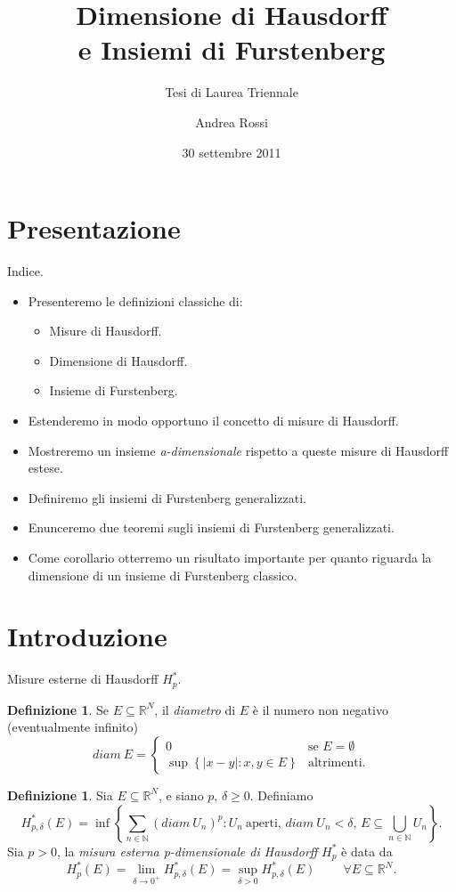 \documentclass[intlimits]{beamer}
\title[Dim. Hausdorff e Ins. Furstenberg]
{Dimensione di Hausdorff\\ e Insiemi di Furstenberg}
\subtitle{Tesi di Laurea Triennale}
\author{Andrea Rossi}
\institute{Università di Pisa}
\date{30 settembre 2011}
\numberwithin{equation}{section}
\theoremstyle{plain}
\theoremstyle{definition}
\newtheorem{defin}[teor]{Definizione}
\theoremstyle{remark}
\newcommand{\gra}[1]{\left\{#1\right\}}
\newcommand{\pa}[1]{\left(#1\right)}
\newcommand{\abs}[1]{\left\lvert#1\right\rvert}
\renewcommand{\ge}{\geqslant}
\begin{document}
\begin{frame}
  \titlepage
\end{frame}



\section{Presentazione}
\begin{frame}{Indice.}
  \begin{itemize}[<+->]
    \item Presenteremo le definizioni classiche di:
      \begin{itemize}[<+->]
        \item Misure di Hausdorff.
        \item Dimensione di Hausdorff.
        \item Insieme di Furstenberg.
        \end{itemize}
    \item
      Estenderemo in modo opportuno il concetto di misure di Hausdorff.
    \item
      Mostreremo un insieme \textit{a-dimensionale} rispetto a queste misure di Hausdorff estese.
    \item
      Definiremo gli insiemi di Furstenberg generalizzati.
    \item
      Enunceremo due teoremi sugli insiemi di Furstenberg generalizzati.
    \item
      Come corollario otterremo un risultato importante per quanto riguarda
      la dimensione di un insieme di Furstenberg classico.
  \end{itemize}
\end{frame}





\section{Introduzione}
\begin{frame}{Misure esterne di Hausdorff $H_p^*$.}
\begin{defin}
Se $E \subseteq \mathbb{R}^N$, il \emph{diametro} di $E$ è il numero 
non negativo (eventualmente infinito)
  \[ diam\ E = \begin{cases}
    0 & \text{se $E = \emptyset$}\\
    \sup \gra{\abs{x- y} : x, y \in E} & \text{altrimenti}
.\end{cases}\]
\end{defin}
\pause
\begin{defin}
Sia $E \subseteq \mathbb{R}^N$, e siano $p,\,\delta \ge 0$. Definiamo
  \[ H^{*}_{p,\delta}(E) = \inf\gra{ \sum_{n \in \mathbb{N}}\pa{diam\ U_n}^p : U_n\ \text{aperti},\, diam\ {U_n} < \delta,\, E \subseteq \bigcup_{n \in \mathbb{N}}U_n}. \]
\pause
Sia $p > 0$, la \emph{misura esterna p-dimensionale di Hausdorff} $H^{*}_p$ è data da
\[ H^{*}_p(E) = \lim_{\delta\to0^+}H^{*}_{p,\delta}(E) = \sup_{\delta > 0}H^{*}_{p,\delta}(E)\   
\qquad   \forall E\subseteq \mathbb{R}^N.\]  
\end{defin}
\end{frame}
\end{document}
